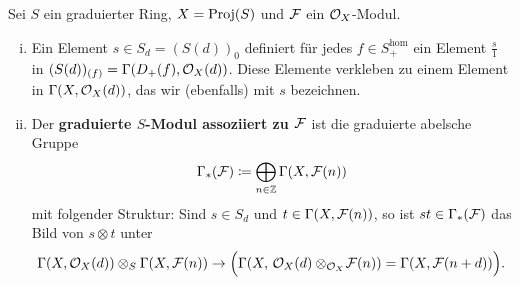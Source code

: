 \begin{defn}
\label{defn:11.13}
	Sei $S$ ein graduierter Ring, $X=\operatorname{Proj}(S)$ und $\mathcal{F}$ ein $\mathcal{O}_X$-Modul.
	\begin{enumerate}[i)]
		\item Ein Element $s \in S_d=(S(d))_0$ definiert für jedes $f \in S_+^\text{hom}$ ein Element $\frac{s}{1}$ in $(S(d))_{(f)} = \Gamma(D_+(f),\mathcal{O}_X(d))$. Diese Elemente verkleben zu einem Element in $\Gamma(X,\mathcal{O}_X(d))$, das wir (ebenfalls) mit $s$ bezeichnen.
		\item Der \textbf{graduierte $S$-Modul assoziiert zu $\mathcal{F}$} ist die graduierte abelsche Gruppe
			\[ \Gamma_*(\mathcal{F})\coloneqq \bigoplus_{n\in \mathbb {Z}}\Gamma(X,\mathcal{F}(n)) \]
			mit folgender Struktur: Sind $s \in S_d$ und $t \in \Gamma(X,\mathcal{F}(n))$, so ist $st \in \Gamma_*(\mathcal{F})$ das Bild von $s \otimes t$ unter
		\[
		 	\Gamma(X,\mathcal{O}_X(d))\otimes_S \Gamma(X,\mathcal{F}(n)) \to \Bigl(\Gamma(X,\,\mathcal{O}_X(d)\otimes_{\mathcal{O}_X}\!\mathcal{F}(n)) = \Gamma(X,\mathcal{F}(n+d))\Bigr).
		 \] 
	\end{enumerate}
	
\end{defn}


